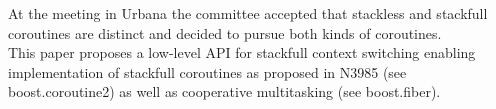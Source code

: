 At the meeting in Urbana the committee accepted that stackless and stackfull
coroutines are distinct and decided to pursue both kinds of coroutines.\\
This paper proposes a low-level API for stackfull context switching enabling
implementation of stackfull coroutines as proposed in N3985 (see
boost.coroutine2\cite{bcoroutine2}) as well as cooperative multitasking (see
boost.fiber\cite{bfiber}).
